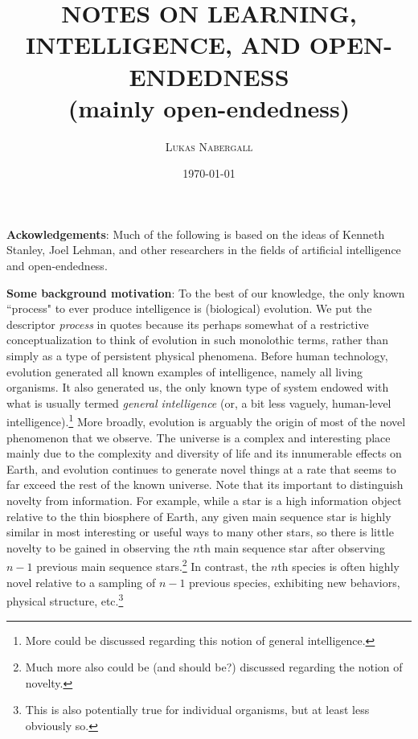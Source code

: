 \documentclass[12pt,letterpaper]{article}
\begin{document}
\title{\normalsize{\uppercase{\textbf{Notes on learning, intelligence, and open-endedness}}} \\ (mainly open-endedness)}
\author{\small{\textsc{Lukas Nabergall}}}
\date{\small{\textsc{\today}}}
\maketitle

\allowdisplaybreaks

\textbf{Ackowledgements}: Much of the following is based on the ideas of Kenneth Stanley, Joel Lehman, and other researchers in the fields of artificial intelligence and open-endedness.

\textbf{Some background motivation}: To the best of our knowledge, the only known ``process" to ever produce intelligence is (biological) evolution. We put the descriptor {\em process} in quotes because its perhaps somewhat of a restrictive conceptualization to think of evolution in such monolothic terms, rather than simply as a type of persistent physical phenomena. Before human technology, evolution generated all known examples of intelligence, namely all living organisms. It also generated us, the only known type of system endowed with what is usually termed {\em general intelligence} (or, a bit less vaguely, human-level intelligence).\footnote{More could be discussed regarding this notion of general intelligence.} More broadly, evolution is arguably the origin of most of the novel phenomenon that we observe. The universe is a complex and interesting place mainly due to the complexity and diversity of life and its innumerable effects on Earth, and evolution continues to generate novel things at a rate that seems to far exceed the rest of the known universe. Note that its important to distinguish novelty from information. For example, while a star is a high information object relative to the thin biosphere of Earth, any given main sequence star is highly similar in most interesting or useful ways to many other stars, so there is little novelty to be gained in observing the $n$th main sequence star after observing $n-1$ previous main sequence stars.\footnote{Much more also could be (and should be?) discussed regarding the notion of novelty.} In contrast, the $n$th species is often highly novel relative to a sampling of $n-1$ previous species, exhibiting new behaviors, physical structure, etc.\footnote{This is also potentially true for individual organisms, but at least less obviously so.}
\end{document}
